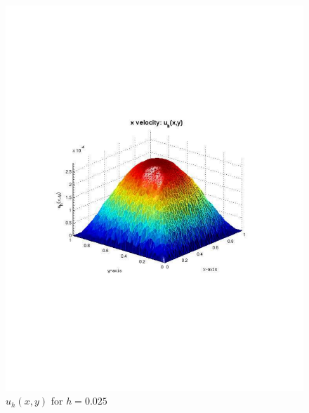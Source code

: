 \documentclass[12pt]{article}
\begin{document}
                \begin{figure}[htb]
                    \begin{center}
                \includegraphics[scale=0.50]{./../files/box/3u.pdf}
                \caption{$u_h(x,y)$ for $h = 0.025$}
            \end{center}
            \end{figure}
\end{document}

